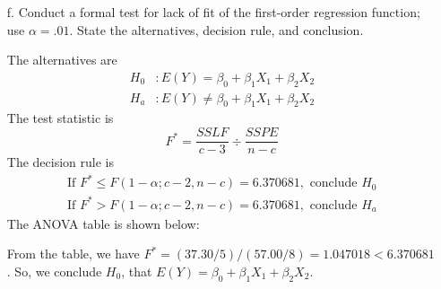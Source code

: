 \documentclass[10pt]{report}
\begin{document}
\begin{enumerate}
	\item [f.]
	Conduct a formal test for lack of fit of the first-order regression function; use $\alpha = .01$. State the alternatives, decision rule, and conclusion.
	
	The alternatives are
	\begin{align*}
		H_0 &: E(Y) = \beta_0 + \beta_1 X_1 + \beta_2 X_2 \\
		H_a &: E(Y) \ne \beta_0 + \beta_1 X_1 + \beta_2 X_2
	\end{align*}
	The test statistic is
	\[
	F^* = \frac{SSLF}{c-3} \div \frac{SSPE}{n-c}
	\]
	The decision rule is
	\begin{align*}
		\text{If } F^* \le F(1-\alpha; c-2, n-c) = 6.370681, \text{ conclude } H_0\\
		\text{If } F^* > F(1-\alpha; c-2, n-c) = 6.370681, \text{ conclude } H_a
	\end{align*}
	The ANOVA table is shown below:
	
	From the table, we have $F^* = (37.30/5)/(57.00/8) = 1.047018 < 6.370681$. So, we conclude $H_0$, that $E(Y) = \beta_0 + \beta_1 X_1 + \beta_2 X_2$.
	
\end{enumerate}
\end{document}
